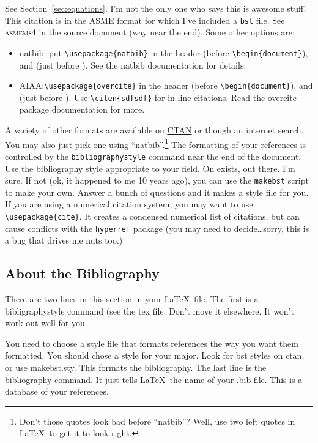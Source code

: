 \documentclass[12pt]{report}
\begin{document}
See Section~\ref{sec:equations}. I'm not the only one who says this is awesome stuff\cite{Mortara2004}!
This citation is in the ASME format for which I've included a \verb'bst'
file. See \textsc{asmems4} in the source document (way near the end). Some  other options are:
\begin{itemize}
\item natbib:  put \verb'\usepackage{natbib}' in the header (before \verb'\begin{document}'), and \verb'' (just before \verb'').  See the natbib documentation for details.
\item AIAA:\@put \verb'\usepackage{overcite}' in the header (before \verb'\begin{document}'), and \verb'' (just before \verb''). Use \verb'\citen{sdfsdf}' for in-line citations. Read the overcite package documentation for more. 
\end{itemize}

A variety of other formats are available on \href{http://www.ctan.org}{CTAN} or though an internet search. You may also just pick one using ``natbib''.\footnote{Don't those quotes look bad before ``natbib''? Well, use two left quotes in \LaTeX\ to get it to look right.}  The formatting of your references is controlled by the \verb'bibliographystyle' command near the end of the document. Use the bibliography style appropriate to your field. On exists, out there. I'm sure. If not (ok, it happened to me 10 years ago), you can use the \verb'makebst' script to make your own. Answer a bunch of questions and it makes a style file for you. If you are using a numerical citation system, you may want to use \verb'\usepackage{cite}'. It creates a condensed numerical list of citations, but can cause conflicts with the \verb'hyperref' package (you may need to decide\ldots sorry, this is a bug that drives me nuts too.)

\subsection{About the Bibliography}
There are two lines in this section in your \LaTeX\ file. The first is a bibligraphystyle command (see the \textsf{tex} file. Don't move it elsewhere. It won't work out well for you.

You need to choose a style file that formats references the way you want them formatted.  You should chose a style for your major.  Look for bst styles on ctan, or use makebst.sty. This formats the bibliography.
The last line is the bibliography command. It just tells \LaTeX\  the name of your \textsf{.bib} file. This is a database of your references. 
\end{document}
